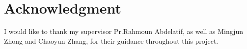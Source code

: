 \section*{Acknowledgment}
I would like to thank my supervisor Pr.Rahmoun Abdelatif, as well as Mingjun Zhong and Chaoyun Zhang, for their guidance throughout this project.

\clearpage
